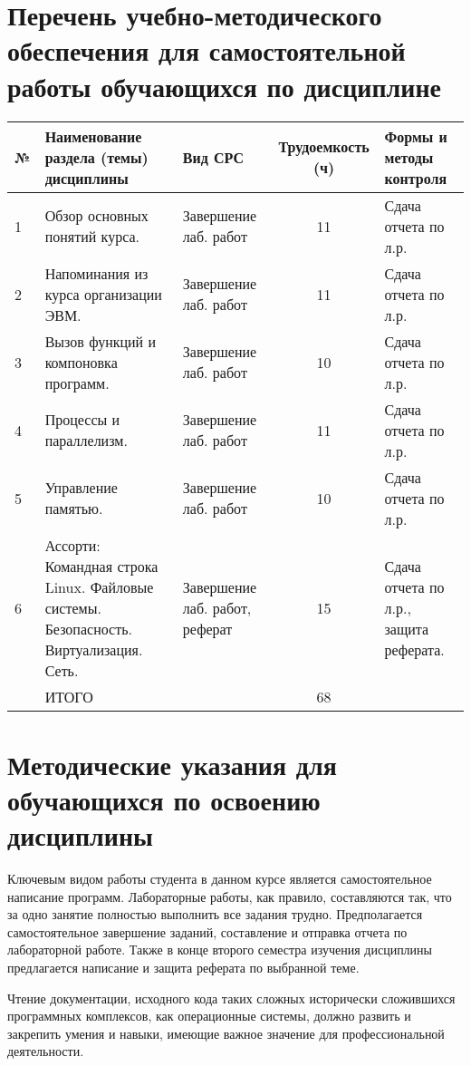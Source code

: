 \documentclass[a4paper,12pt]{article}
\begin{document}
\section{Перечень учебно-методического обеспечения для самостоятельной работы обучающихся по дисциплине}
\begin{longtable}{|l|>{\raggedright\arraybackslash}p{40mm}|>{\raggedright\arraybackslash}p{54mm}|c|>{\raggedright\arraybackslash}p{30mm}|}
\hline
№ & \centering Наименование раздела (темы) дисциплины & 
\centering Вид СРС & \multicolumn{1}{p{14mm}|}{\centering Трудо\-емкость (ч)} & \centering\arraybackslash Формы и методы контроля\\
\hline
1 & Обзор основных понятий курса. 		  & Завершение лаб. работ & 11 & Сдача отчета по л.р. \\ 
\hline
2 & Напоминания из курса организации ЭВМ.   & Завершение лаб. работ & 11 & Сдача отчета по л.р. \\ 
\hline
3 & Вызов функций и компоновка программ.    & Завершение лаб. работ & 10 & Сдача отчета по л.р. \\ 
\hline
4 & Процессы и параллелизм. 			      & Завершение лаб. работ & 11 & Сдача отчета по л.р. \\ 
\hline
5 & Управление памятью.                     & Завершение лаб. работ & 10 & Сдача отчета по л.р. \\ 
\hline
6 & Ассорти: Командная строка Linux. Файловые системы. Безопасность. Виртуализация. Сеть.  & Завершение лаб. работ, реферат & 15 & Сдача отчета по л.р., защита реферата. \\ 
\hline
 & ИТОГО                                   &                       & 68 &  \\ 

\hline
\end{longtable}


\section{Методические указания для обучающихся по освоению дисциплины}
Ключевым видом работы студента в данном курсе является самостоятельное написание программ.
Лабораторные работы, как правило, составляются так, что за одно занятие полностью выполнить
все задания трудно. Предполагается самостоятельное завершение заданий, составление
и отправка отчета по лабораторной работе. Также в конце второго семестра изучения
дисциплины предлагается написание и защита реферата по выбранной теме.
\par
Чтение документации, исходного кода таких сложных исторически сложившихся программных
комплексов, как операционные системы, должно развить и закрепить умения и навыки, имеющие
важное значение для профессиональной деятельности.
\end{document}
